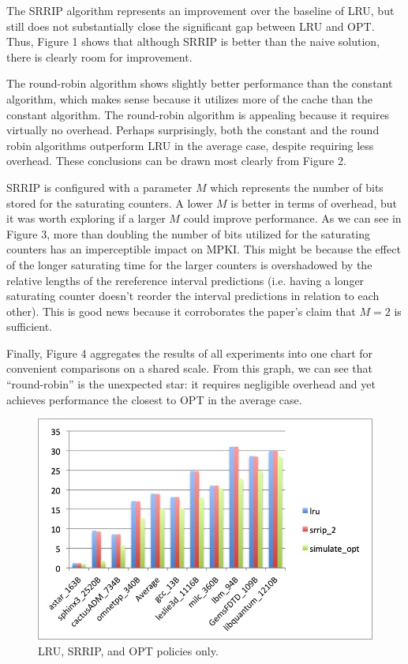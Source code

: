 \documentclass[9pt]{article}
\begin{document}
	The SRRIP algorithm represents an improvement over the baseline of LRU, but still does not substantially close the significant gap between LRU and OPT. Thus, Figure 1 shows that although SRRIP is better than the naive solution, there is clearly room for improvement. 

	The round-robin algorithm shows slightly better performance than the constant algorithm, which makes sense because it utilizes more of the cache than the constant algorithm. The round-robin algorithm is appealing because it requires virtually no overhead. Perhaps surprisingly, both the constant and the round robin algorithms outperform LRU in the average case, despite requiring less overhead. These conclusions can be drawn most clearly from Figure 2. 

	SRRIP is configured with a parameter $M$ which represents the number of bits stored for the saturating counters. A lower $M$ is better in terms of overhead, but it was worth exploring if a larger $M$ could improve performance. As we can see in Figure 3, more than doubling the number of bits utilized for the saturating counters has an imperceptible impact on MPKI. This might be because the effect of the longer saturating time for the larger counters is overshadowed by the relative lengths of the rereference interval predictions (i.e. having a longer saturating counter doesn't reorder the interval predictions in relation to each other). This is good news because it corroborates the paper's claim that $M = 2$ is sufficient. 

	Finally, Figure 4 aggregates the results of all experiments into one chart for convenient comparisons on a shared scale. From this graph, we can see that ``round-robin'' is the unexpected star: it requires negligible overhead and yet achieves performance the closest to OPT in the average case. 
 
\pagebreak

\begin{figure}[t]
  \centering
  \includegraphics[height=.45\textheight]{distilled.png}
  \caption{LRU, SRRIP, and OPT policies only.}
\end{figure}
\end{document}
